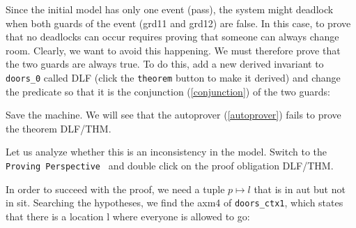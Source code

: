 Since the initial model has only one event (\textsf{pass}), the system might deadlock when both guards of the event (\textsf{grd11} and \textsf{grd12}) are false. In this case, to prove that no deadlocks can occur requires proving that someone can always change room. Clearly, we want to avoid this happening. We must therefore prove that the two guards are always true. To do this, add a new derived invariant to \texttt{doors\_0} called \textsf{DLF} (click the \texttt{theorem} button to make it derived) and change the predicate so that it is the conjunction (\ref{conjunction}) of the two guards:

\begin{description}
\INVARIANTS
	\begin{description}
	\end{description}
\end{description}


Save the machine. We will see that the autoprover (\ref{autoprover}) fails to prove the theorem \textsf{DLF/THM}.


Let us analyze whether this is an inconsistency in the model. Switch to the \texttt{Proving Perspective } and double click on the proof obligation \textsf{DLF/THM}.



In order to succeed with the proof, we need a tuple $p \mapsto l$ that is in \textsf{aut} but not in \textsf{sit}. Searching the hypotheses, we find the \textsf{axm4} of \texttt{doors\_ctx1}, which states that there is a location \textsf{l} where everyone is allowed to go:

\begin{description}
\AXIOMS
	\begin{description}
		\nItemX{ axm4 }{ \exists l\qdot l\in L\setminus \{ outside\}  \land  P\cprod \{ l\} \subseteq aut }
	\end{description}
\end{description}


